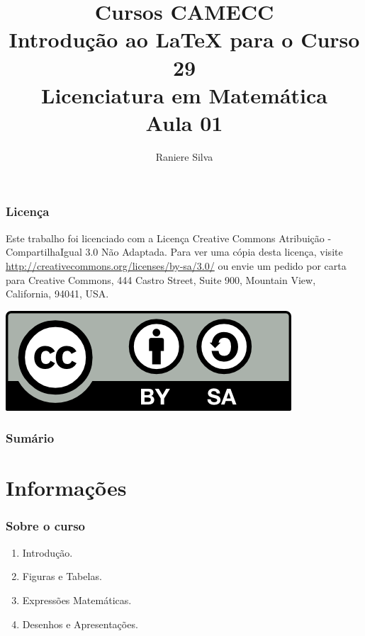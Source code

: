 \documentclass[12pt]{beamer}
\begin{document}
\title[Introdu\c{c}\~{a}o ao LaTeX - 01/04]{Cursos CAMECC \\ Introdu\c{c}\~{a}o ao LaTeX para o Curso 29 \\ Licenciatura em Matem\'{a}tica \\ Aula 01}
\author{Raniere Silva}
\begin{frame}
    \titlepage
\end{frame}

\begin{frame}
    \frametitle{Licen\c{c}a}
    Este trabalho foi licenciado com a Licen\c{c}a Creative Commons Atribui\c{c}\~{a}o - CompartilhaIgual 3.0 N\~{a}o Adaptada. Para ver uma c\'{o}pia desta licen\c{c}a, visite \url{http://creativecommons.org/licenses/by-sa/3.0/} ou envie um pedido por carta para Creative Commons, 444 Castro Street, Suite 900, Mountain View, California, 94041, USA.
    \begin{center}
        \includegraphics[keepaspectratio=true]{../../figures/cc-by-sa.png}
    \end{center}
\end{frame}

\begin{frame}
    \frametitle{Sum\'{a}rio}
    \tableofcontents
\end{frame}

\section{Informa\c{c}\~{o}es}
\begin{frame}
    \frametitle{Sobre o curso}
    \begin{enumerate}
        \item Introdu\c{c}\~{a}o.
        \item Figuras e Tabelas.
        \item Express\~{o}es Matem\'{a}ticas.
        \item Desenhos e Apresenta\c{c}\~{o}es.
    \end{enumerate}
\end{frame}
\end{document}
